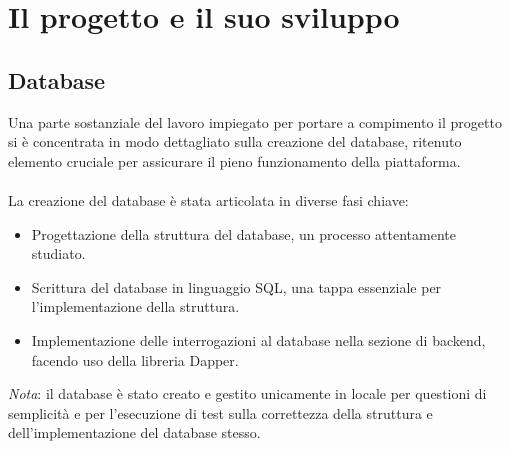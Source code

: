\chapter{Il progetto e il suo sviluppo}\label{chapter:formattazione}
%
\section{Database}\label{sec:cap_sec_subsec}
Una parte sostanziale del lavoro impiegato per portare a compimento il
progetto si è concentrata in modo dettagliato sulla creazione del database,
ritenuto elemento cruciale per assicurare il pieno funzionamento della
piattaforma. \\ \\ La creazione del database è stata articolata in diverse fasi
chiave:
\begin{itemize}
	\item Progettazione della struttura del database, un processo attentamente studiato.
	\item Scrittura del database in linguaggio SQL, una tappa essenziale per l'implementazione della struttura.
	\item Implementazione delle interrogazioni al database nella sezione di backend,
	      facendo uso della libreria Dapper.
\end{itemize}
\textit{Nota}: il database è stato creato e gestito unicamente in locale per questioni di semplicità e per
l'esecuzione di test sulla correttezza della struttura e dell'implementazione del database stesso.
%
